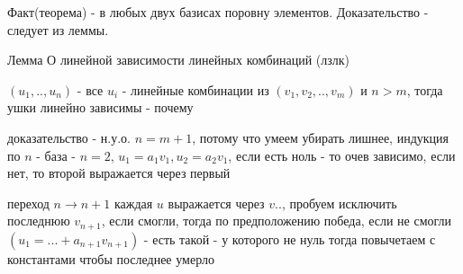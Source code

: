 \documentclass[12pt]{article}
\begin{document}
Факт(теорема) - в любых двух базисах поровну элементов. Доказательство - следует из леммы.

Лемма О линейной зависимости линейных комбинаций  (лзлк)

$(u_1, .., u_n)$ - все $u_i$ - линейные комбинации из $(v_1, v_2, .. , v_m)$ и $n > m$, тогда ушки линейно зависимы - почему

доказательство - н.у.о. $n = m + 1$, потому что умеем убирать лишнее, индукция по $n$ - база - $n = 2$, $u_1 = a_1v_1, u_2 = a_2v_1$, если есть ноль - то очев зависимо, если нет, то второй выражается через первый

переход $n \rightarrow n + 1$ каждая $u$ выражается через $v$.., пробуем исключить последнюю $v_{n + 1}$, если смогли, тогда по предположению победа, если не смогли $(u_1 = ... + a_{n + 1}v_{n + 1})$ - есть такой - у которого не нуль тогда повычетаем с константами чтобы последнее умерло 
\end{document}
